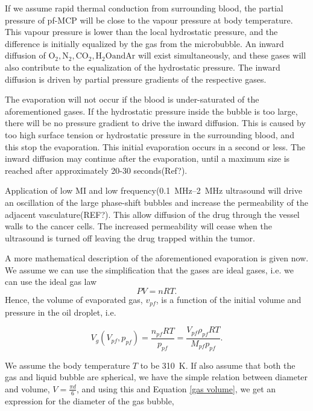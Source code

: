 If we assume rapid thermal conduction from surrounding blood, the partial pressure of pf-MCP will be close to the vapour pressure at body temperature. This vapour pressure is lower than the local hydrostatic pressure, and the difference is initially equalized by the gas from the microbubble. An inward diffusion of $\mathrm{O_2, N_2, CO_2, H_2O and Ar}$ will exist simultaneously, and these gases will also contribute to the equalization of the hydrostatic pressure. The inward diffusion is driven by partial pressure gradients of the respective gases. 

The evaporation will not occur if the blood is under-saturated of the aforementioned gases. If the hydrostatic pressure inside the bubble is too large, there will be no pressure gradient to drive the inward diffusion. This is caused by too high surface tension or hydrostatic pressure in the surrounding blood, and this stop the evaporation. This initial evaporation occurs in a second or less\cite{Healey2013}. The inward diffusion may continue after the evaporation, until a maximum size is reached after approximately 20-30 seconds(Ref?).

Application of low MI and low frequency(\SIrange{0.1}{2}{\mega\hertz} ultrasound will drive an oscillation of the large phase-shift bubbles and increase the permeability of the adjacent vasculature(REF?). This allow diffusion of the drug through the vessel walls to the cancer cells. The increased permeability will cease when the ultrasound is turned off leaving the drug trapped within the tumor.

A more mathematical description of the aforementioned evaporation is given now\cite{Healey2013}. We assume we can use the simplification that the gases are ideal gases, i.e. we can use the ideal gas law
\begin{equation}
\label{ideal gas law}
 PV = nRT. 
\end{equation}  
Hence, the volume of evaporated gas, $v_{pf}$, is a function of the initial volume and pressure in the oil droplet, i.e.

\begin{equation}
\label{gas volume}
V_g(V_{pf}, p_{pf}) = \frac{n_{pf}RT}{p_{pf}}=\frac{V_{pf}\rho_{pf}RT}{M_{pf}p_{pf}}.
\end{equation}

We assume the body temperature $T$ to be \SI{310}{\kelvin}. If also assume that both the gas and liquid bubble are spherical, we have the simple relation between diameter and volume, $V = \frac{\pi d}{6}$, and using this and Equation \eqref{gas volume}, we get an expression for the diameter of the gas bubble, 

